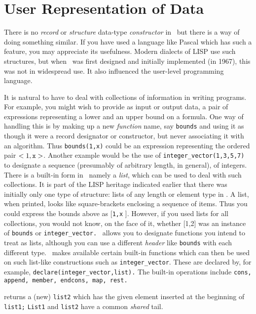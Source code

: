 \section{User Representation of Data}

There is no {\it record} or {\it structure} data-type {\it constructor} in
\Max\,
but there is a way of doing something similar.  If you have used a
language like Pascal which has such a feature, you may appreciate
its usefulness. Modern dialects of LISP use such structures, but when
\Max\
was first designed and initially implemented (in 1967), this was not
in widespread use.  It also influenced the user-level programming language.

It
is natural to have to deal with collections of information in writing
programs. For example, you might wish to provide as input or output
data, a pair of expressions representing a lower and an upper bound on
a formula. One way of handling this is by making up a new {\it function}
name, say {\tt bounds}
and using it as though it were a record designator or
constructor,
but never associating it with an algorithm.  Thus {\tt bounds(1,x)}
could
be an expression representing the ordered pair $<1,{\tt x}>$.
Another example would be the use of {\tt integer\_vector(1,3,5,7)}
to designate a sequence (presumably of arbitrary length, in general),
of integers.  There is a built-in form in
\Max\,
namely a {\it list}, which can be used to deal with such collections.
It is part of the LISP heritage indicated earlier that there was initially
only one type of structure: lists of any length or element type in
\Max.
A list, when printed, looks like square-brackets
enclosing a sequence of items. Thus you could express the bounds above
as [{\tt 1,x}
]. However, if you used lists for all collections, you
would not know, on the face of it, whether [1,2] was an instance of
{\tt bounds}
or
{\tt integer\_vector.}
\Max\
allows you to designate functions you intend to treat as lists, although
you can use a different {\it header} like
{\tt bounds}
with each different type.
\Max\
makes available certain built-in
functions which can then be used on such list-like constructions
such as {\tt integer\_vector}.  These are declared by, for example,
{\tt declare(integer\_vector,list).}
The built-in operations include
{\tt cons, append, member, endcons, map, rest.}

returns a (new) {\tt list2} which has the given
element inserted at the beginning of 
{\tt list1;} {\tt List1} and {\tt list2}
have a common {\it shared} tail.

